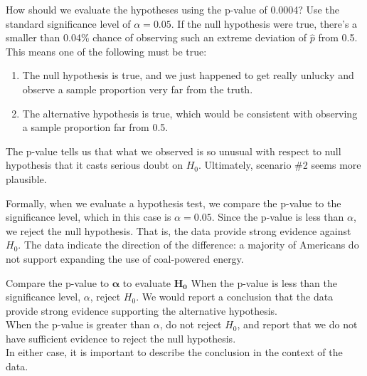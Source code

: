 \begin{examplewrap}
\begin{nexample}{How should we evaluate the hypotheses using the
    p-value of 0.0004? Use the standard significance level of
    $\alpha = 0.05$.}
  If the null hypothesis were true, there's a smaller than 0.04\%
  chance of observing such an extreme deviation of
  $\hat{p}$ from 0.5.
  This means one of the following must be true:
  \begin{enumerate}
    \item The null hypothesis is true, and we just happened
        to get really unlucky and observe a sample proportion
        very far from the truth.
    \item The alternative hypothesis is true,
        which would be consistent
        with observing a sample proportion far from 0.5.
  \end{enumerate}
  The p-value tells us that what we observed is so unusual
  with respect to null hypothesis that it casts serious doubt
  on $H_0$.
  Ultimately, scenario \#2 seems more plausible.

  Formally, when we evaluate a hypothesis test,
  we compare the p-value to the significance level,
  which in this case is $\alpha = 0.05$.
  Since the p-value is less than $\alpha$,
  we reject the null hypothesis.
  That is, the data provide strong evidence against $H_0$.
  The data indicate the direction of the difference:
  a majority of Americans do not support
  expanding the use of coal-powered energy.
\end{nexample}
\end{examplewrap}


\begin{onebox}{Compare the p-value to $\mathbf{\alpha}$ to
      evaluate $\mathbf{H_0}$}
  When the p-value is less than the significance level, $\alpha$,
  reject $H_0$. We would report a conclusion that the data provide
  strong evidence supporting the alternative hypothesis. \\[2mm]
  When the p-value is greater than $\alpha$, do not reject $H_0$,
  and report that we do not have sufficient evidence to reject the
  null hypothesis. \\[2mm]
  In either case, it is important to describe the conclusion
  in the context of the data.
\end{onebox}







